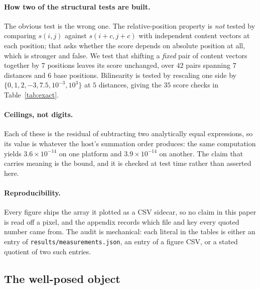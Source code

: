 \documentclass{article}
\theoremstyle{plain}
\theoremstyle{remark}
\begin{document}
\paragraph{How two of the structural tests are built.} The obvious test is the
wrong one. The relative-position property is \emph{not} tested by comparing
$s(i,j)$ against $s(i + c, j + c)$ with independent content vectors at each
position; that asks whether the score depends on absolute position at all, which
is stronger and false. We test that shifting a \emph{fixed} pair of content
vectors together by $7$ positions leaves its score unchanged, over $42$ pairs
spanning $7$ distances and $6$ base positions. Bilinearity is tested by
rescaling one side by $\{0, 1, 2, -3, 7.5, 10^{-3}, 10^{3}\}$ at $5$ distances,
giving the $35$ score checks in Table~\ref{tab:exact}.

\paragraph{Ceilings, not digits.} Each of these is the residual of subtracting
two analytically equal expressions, so its value is whatever the host's
summation order produces: the same computation yields $3.6\times10^{-14}$ on one
platform and $3.9\times10^{-14}$ on another. The claim that carries meaning is
the bound, and it is checked at test time rather than asserted here.

\paragraph{Reproducibility.} Every figure ships the array it plotted as a CSV
sidecar, so no claim in this paper is read off a pixel, and the appendix records
which file and key every quoted number came from. The audit is mechanical: each
literal in the tables is either an entry of \texttt{results/measurements.json},
an entry of a figure CSV, or a stated quotient of two such entries.




\subsection{The well-posed object}
\label{app:wellposed}
\end{document}
